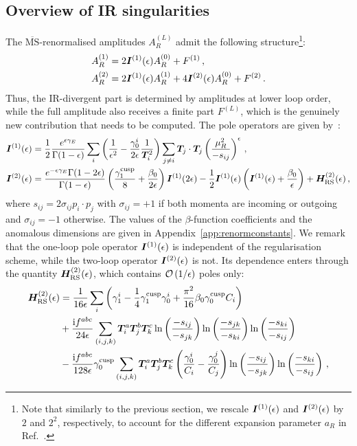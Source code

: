 \documentclass[main.tex]{subfiles}
\begin{document}
\subsection{Overview of IR singularities}
The $\overline{\text{MS}}$-renormalised amplitudes $A_R^{(L)}$ admit the following structure\footnote{Note that similarly to the previous section, we rescale $\bm{I}^{(1)}(\epsilon)$ and $\bm{I}^{(2)}(\epsilon)$ by $2$ and $2^2$, respectively, to account for the different expansion parameter $a_R$ in Ref.~\cite{Catani:1998bh}.}:
\begin{align}
    A_R^{(1)} &= 2\bm{I}^{(1)}(\epsilon) A_R^{(0)} + F^{(1)}\,, \label{eq:A1IRstructure} \\
    A_R^{(2)} &= 2\bm{I}^{(1)}(\epsilon) A_R^{(1)} + 4\bm{I}^{(2)}(\epsilon) A_R^{(0)} + F^{(2)} \,. \label{eq:A2IRstructure}
\end{align}
Thus, the IR-divergent part is determined by amplitudes at lower loop order, while the full amplitude also receives a finite part $F^{(L)}$, which is the genuinely new contribution that needs to be computed. The pole operators are given by~\cite{Catani:1998bh}:
\begin{align}
    \bm{I}^{(1)}(\epsilon) &= \frac{1}{2} \frac{e^{\epsilon \gamma_E}}{\Gamma(1-\epsilon)} \sum_i \left(\frac{1}{\epsilon^2} - \frac{\gamma_0^i}{2\epsilon} \frac{1}{\bm{T}_i^2}\right) \sum_{j\neq i} \bm{T}_j \cdot \bm{T}_j \left(\frac{\mu_R^2}{-s_{ij}} \right)^\epsilon\,, \\
    \bm{I}^{(2)}(\epsilon) &= \frac{e^{-\epsilon \gamma_E} \Gamma(1-2\epsilon)}{\Gamma(1-\epsilon)} \left( \frac{\gamma_1^\text{cusp}}{8} + \frac{\beta_0}{2\epsilon} \right) \bm{I}^{(1)}(2\epsilon) - \frac{1}{2}\bm{I}^{(1)}(\epsilon) \left(\bm{I}^{(1)}(\epsilon) + \frac{\beta_0}{\epsilon} \right) + \bm{H}_{\text{RS}}^{(2)}(\epsilon)\,,
\end{align}
where $s_{ij} = 2\sigma_{ij} p_i \cdot p_j$ with $\sigma_{ij}=+1$ if both momenta are incoming or outgoing and $\sigma_{ij}=-1$ otherwise. The values of the $\beta$-function coefficients and the anomalous dimensions are given in Appendix~\ref{app:renormconstants}. We remark that the one-loop pole operator $\bm{I}^{(1)}(\epsilon)$ is independent of the regularisation scheme, while the two-loop operator $\bm{I}^{(2)}(\epsilon)$ is not. Its dependence enters through the quantity $\bm{H}_{\text{RS}}^{(2)}(\epsilon)$, which contains $\mathcal{O}\left(1/\epsilon\right)$ poles only:
\begin{align} \label{eq:IR_H_function}
    \bm{H}_{\text{RS}}^{(2)}(\epsilon) &= \frac{1}{16\epsilon} \sum_i \left(\gamma_1^i - \frac{1}{4} \gamma_1^{\text{cusp}}\gamma_0^i + \frac{\pi^2}{16} \beta_0 \gamma_0^{\text{cusp}} C_i \right) \nonumber \\
    &+ \frac{\mathrm{i} f^{abc}}{24\epsilon} \sum_{(i,j,k)} \bm{T}_i^a \bm{T}_j^b \bm{T}_k^c \ln\left(\frac{-s_{ij}}{-s_{jk}} \right) \ln\left(\frac{-s_{jk}}{-s_{ki}} \right) \ln\left(\frac{-s_{ki}}{-s_{ij}} \right) \\ 
    &-\frac{\mathrm{i} f^{abc}}{128\epsilon} \gamma_0^{\text{cusp}} \sum_{(i,j,k)} \bm{T}_i^a \bm{T}_j^b \bm{T}_k^c \left( \frac{\gamma_0^i}{C_i} - \frac{\gamma_0^j}{C_j} \right)\ln\left(\frac{-s_{ij}}{-s_{jk}} \right) \ln\left(\frac{-s_{ki}}{-s_{ij}} \right)\,, \nonumber
\end{align}
\end{document}
